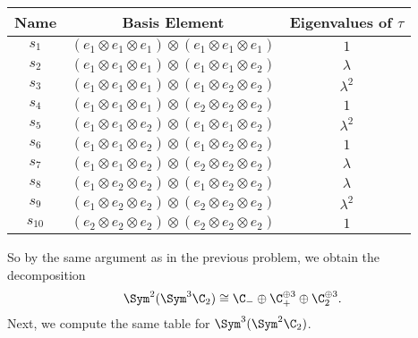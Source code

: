 \documentclass[11pt,letterpaper]{article}
\begin{document}
\begin{center}
\begin{tabular}{ |c|c|c| } 
     \hline
     \textbf{Name}& \textbf{Basis Element} & \textbf{Eigenvalues of $\tau$} \\ 
     \hline
     $s_1$&$(e_1\otimes e_1\otimes e_1)\otimes (e_1\otimes e_1\otimes e_1)$ & $1$ \\ 
     $s_2$&$(e_1\otimes e_1\otimes e_1)\otimes (e_1\otimes e_1\otimes e_2)$ & $\lambda$ \\ 
     $s_3$&$(e_1\otimes e_1\otimes e_1)\otimes (e_1\otimes e_2\otimes e_2)$ & $\lambda^2$ \\ 
     $s_4$&$(e_1\otimes e_1\otimes e_1)\otimes (e_2\otimes e_2\otimes e_2)$ & $1$ \\ 
     $s_5$&$(e_1\otimes e_1\otimes e_2)\otimes (e_1\otimes e_1\otimes e_2)$ & $\lambda^2$ \\ 
     $s_6$&$(e_1\otimes e_1\otimes e_2)\otimes (e_1\otimes e_2\otimes e_2)$ & $1$ \\ 
     $s_7$&$(e_1\otimes e_1\otimes e_2)\otimes (e_2\otimes e_2\otimes e_2)$ & $\lambda$ \\ 
     $s_8$&$(e_1\otimes e_2\otimes e_2)\otimes (e_1\otimes e_2\otimes e_2)$ & $\lambda$ \\ 
     $s_9$&$(e_1\otimes e_2\otimes e_2)\otimes (e_2\otimes e_2\otimes e_2)$ & $\lambda^2$ \\ 
     $s_{10}$&$(e_2\otimes e_2\otimes e_2)\otimes (e_2\otimes e_2\otimes e_2)$ & $1$ \\ 
 \hline
\end{tabular}
\end{center}

So by the same argument as in the previous problem, we obtain the decomposition
\[
    \Sym^2(\Sym^3\C_2)\cong \C_-\oplus\C_+^{\oplus 3}\oplus \C_2^{\oplus 3}
.\] 
Next, we compute the same table for $\Sym^3(\Sym^2\C_2)$.
\end{document}
